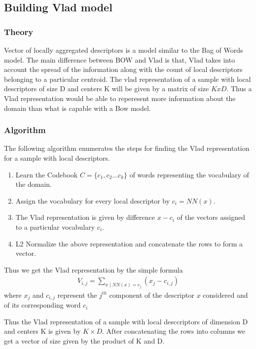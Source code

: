 \documentclass[final,leqno,onefignum,onetabnum]{siamltexmm}
\begin{document}
\subsection{Building Vlad model}

\subsubsection{Theory}
Vector of locally aggregated descriptors is a model similar to the Bag of Words model.  
The main difference between BOW and Vlad is that, Vlad takes into account the spread of the information along with the count of local descriptors belonging to a particular centroid.
The vlad representation of a sample with local descriptors of size D and centers K will be given by a matrix of size $K x D $.  Thus a Vlad representation would be able to reperesent more information about the domain than what is capable with a Bow model.

\subsubsection{Algorithm}
The following algorithm enumerates the steps for finding the Vlad representation for a sample with local descriptors.
\begin{enumerate}
  \item Learn the Codebook $ C = \{c_{1}, c_{2} \ldots c_{k}\} $ of words representing the vocabulary of the domain.
  \item Assign the vocabulary for every local descriptor by $ c_{i} = NN(x) $.
  \item The Vlad representation is given by difference $ x - c_{i} $ of the vectors assigned to a particular vocabulary $ c_{i} $.
  \item L2 Normalize the above representation and concatenate the rows to form a vector.
\end{enumerate}

Thus we get the Vlad representation by the simple formula
\begin{align*}
  V_{i,j} = \sum_{x \mid NN(x) = c_{j}} (x_{j} - c_{i, j})
\end{align*}
where $x_{j}$ and $c_{i,j}$ represent the $j^{th}$ component of the descriptor $x$ considered and of its corresponding word $c_{i}$

Thus the Vlad representation of a sample with local desccriptors of dimension D and centers K is given by $ K \times D $.
After concatenating the rows into columns we get a vector of size given by the product of K and D.
\end{document}
